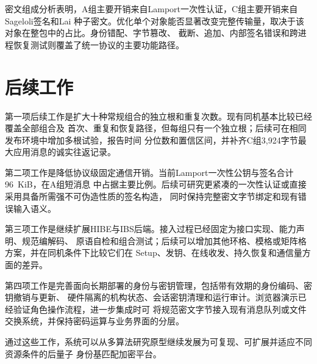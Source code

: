 密文组成分析表明，A组主要开销来自Lamport一次性认证，C组主要开销来自Sageloli签名和Lai
种子密文。优化单个对象能否显著改变完整传输量，取决于该对象在整包中的占比。身份错配、字节篡改、
截断、追加、内部签名错误和跨进程恢复测试则覆盖了统一协议的主要功能路径。

\section{后续工作}

第一项后续工作是扩大十种常规组合的独立根和重复次数。现有同机基本比较已经覆盖全部组合及
首次、重复和恢复路径，但每组只有一个独立根；后续可在相同发布环境中增加多根试验，报告时间
分位数和置信区间，并补齐C组3,924字节最大应用消息的诚实往返记录。

第二项工作是降低协议级固定通信开销。当前Lamport一次性公钥与签名合计96~KiB，在A组短消息
中占据主要比例。后续可研究更紧凑的一次性认证或直接采用具备所需强不可伪造性质的签名构造，
同时保持完整密文字节绑定和现有错误输入语义。

第三项工作是继续扩展HIBE与IBS后端。接入过程已经固定为接口实现、能力声明、规范编解码、
原语自检和组合测试；后续可以增加其他环格、模格或矩阵格方案，并在同机条件下比较它们在
Setup、发钥、在线收发、持久恢复和通信量方面的差异。

第四项工作是完善面向长期部署的身份与密钥管理，包括带有效期的身份编码、密钥撤销与更新、
硬件隔离的机构状态、会话密钥清理和运行审计。浏览器演示已经验证角色操作流程，进一步集成时可
将规范密文字节接入现有消息队列或文件交换系统，并保持密码运算与业务界面的分层。

通过这些工作，系统可以从多算法研究原型继续发展为可复现、可扩展并适应不同资源条件的后量子
身份基匹配加密平台。
